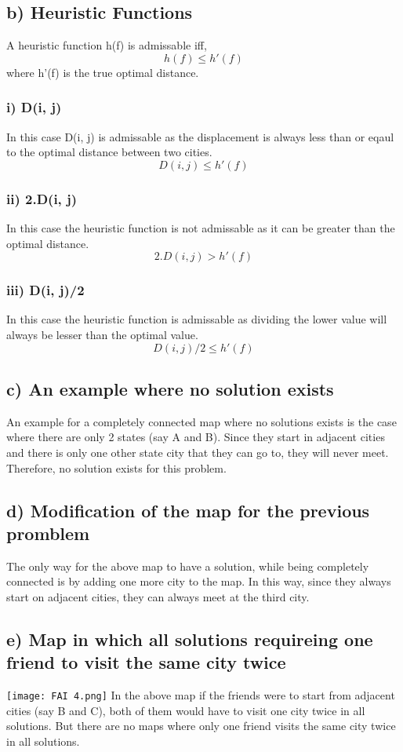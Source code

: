 \documentclass[12pt]{scrartcl}
\begin{document}
    \subsection*{b) Heuristic Functions}
        A heuristic function h(f) is admissable iff,
        \[h(f) \le h'(f)\]
        where h'(f) is the true optimal distance.
        \subsubsection*{i) D(i, j)}
            In this case D(i, j) is admissable as the displacement is always less than or eqaul to the optimal distance between two cities.
            \[D(i, j) \le h'(f)\]
        \subsubsection*{ii) 2.D(i, j)}
            In this case the heuristic function is not admissable as it can be greater than the optimal distance.
            \[2.D(i, j) > h'(f)\]
        \subsubsection*{iii) D(i, j)/2}
            In this case the heuristic function is admissable as dividing the lower value will always be lesser than the optimal value.
            \[D(i, j)/2 \le h'(f)\]

    \subsection*{c) An example where no solution exists}
        An example for a completely connected map where no solutions exists is the case where there are only 2 states (say A and B).
        Since they start in adjacent cities and there is only one other state city that they can go to, they will never meet.
        Therefore, no solution exists for this problem.

    \subsection*{d) Modification of the map for the previous promblem}
        The only way for the above map to have a solution, while being completely connected is by adding one more city to the map.
        In this way, since they always start on adjacent cities, they can always meet at the third city.

    \subsection*{e) Map in which all solutions requireing one friend to visit the same city twice}
        \texttt{[image: FAI 4.png]}
        In the above map if the friends were to start from adjacent cities (say B and C), both of them would have to visit one city twice in all solutions.
        But there are no maps where only one friend visits the same city twice in all solutions.
\end{document}
